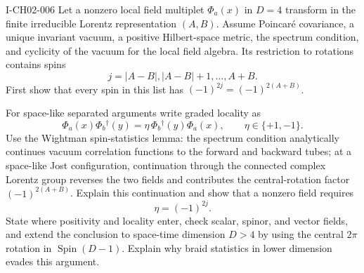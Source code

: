 \begin{exercise}{I-CH02-006}
Let a nonzero local field multiplet $\Phi_a(x)$ in $D=4$ transform in the finite
irreducible Lorentz representation $(A,B)$. Assume Poincar\'e covariance, a
unique invariant vacuum, a positive Hilbert-space metric, the spectrum
condition, and cyclicity of the vacuum for the local field algebra. Its
restriction to rotations contains spins
\[
  j=|A-B|,|A-B|+1,\ldots,A+B.
\]
First show that every spin in this list has
$(-1)^{2j}=(-1)^{2(A+B)}$.

For space-like separated arguments write graded locality as
\[
  \Phi_a(x)\Phi_b{}^\dagger(y)
  =\eta\,\Phi_b{}^\dagger(y)\Phi_a(x),
  \qquad \eta\in\{+1,-1\}.
\]
Use the Wightman spin-statistics lemma: the spectrum condition analytically
continues vacuum correlation functions to the forward and backward tubes; at
a space-like Jost configuration, continuation through the connected complex
Lorentz group reverses the two fields and contributes the central-rotation
factor $(-1)^{2(A+B)}$. Explain this continuation and show that a nonzero field
requires
\[
  \eta=(-1)^{2j}.
\]
State where positivity and locality enter, check scalar, spinor, and vector
fields, and extend the conclusion to space-time dimension $D>4$ by using the
central $2\pi$ rotation in $\operatorname{Spin}(D-1)$. Explain why braid
statistics in lower dimension evades this argument.
\end{exercise}
